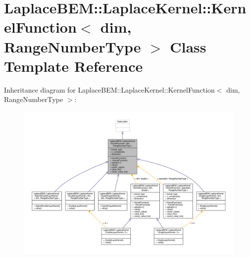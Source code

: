 \hypertarget{classLaplaceBEM_1_1LaplaceKernel_1_1KernelFunction}{}\section{Laplace\+B\+EM\+:\+:Laplace\+Kernel\+:\+:Kernel\+Function$<$ dim, Range\+Number\+Type $>$ Class Template Reference}
\label{classLaplaceBEM_1_1LaplaceKernel_1_1KernelFunction}


Inheritance diagram for Laplace\+B\+EM\+:\+:Laplace\+Kernel\+:\+:Kernel\+Function$<$ dim, Range\+Number\+Type $>$\+:\nopagebreak
\begin{figure}[H]
\begin{center}
\leavevmode
\includegraphics[width=350pt]{classLaplaceBEM_1_1LaplaceKernel_1_1KernelFunction__inherit__graph}
\end{center}
\end{figure}


